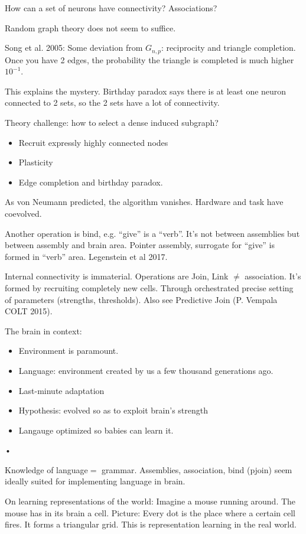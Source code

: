 How can a set of neurons have connectivity? 
Associations?

Random graph theory does not seem to suffice. 

Song et al. 2005: Some deviation from $G_{n,p}$: reciprocity and triangle completion.  Once you have 2 edges, the probability the triangle is completed is much higher $10^{-1}$. 

This explains the mystery. Birthday paradox says there is at least one neuron connected to 2 sets, so the 2 sets have a lot of connectivity.

Theory challenge: how to select a dense induced subgraph?
\begin{itemize}
\item
Recruit expressly highly connected nodes
\item
Plasticity
\item
Edge completion and birthday paradox.
\end{itemize}

As  von Neumann predicted, the algorithm vanishes. Hardware and task have coevolved.

Another operation is bind, e.g. ``give'' is a ``verb''. It's not between assemblies but between assembly and brain area. Pointer assembly, surrogate for ``give'' is formed in ``verb'' area.
Legenstein et al 2017.

Internal connectivity is immaterial. Operations are Join, Link $\ne$ association. It's formed by recruiting completely new cells. Through orchestrated precise setting of parameters (strengths, thresholds). Also see Predictive Join (P. Vempala COLT 2015). %

The brain in context:
\begin{itemize}
\item
Environment is paramount.
\item
Language: environment created by us a few thousand generations ago.
\item
Last-minute adaptation
\item
Hypothesis: evolved so as to exploit brain's strength
\item
Langauge optimized so babies can learn it.
\end{itemize}•

Knowledge of language$=$ grammar. Assemblies, association, bind (pjoin) seem ideally suited for implementing language in brain.

On learning representations of the world:  Imagine a mouse running around. The mouse has in its brain a cell. Picture: Every dot is the place where a certain cell fires. It forms a triangular grid. This is representation learning in the real world.

